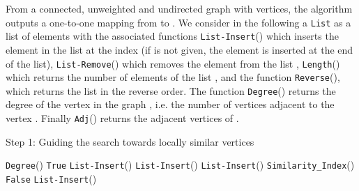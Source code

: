 \documentclass{scrartcl}
\theoremstyle{plain}
\begin{document}
From a connected, unweighted and undirected graph  with  vertices,  
the algorithm outputs a one-to-one mapping  from  to . We consider in the following a \texttt{List} as a list of elements with 
the associated functions \texttt{List-Insert}() which inserts the 
element  in the list  at the index  (if  is not given, the 
element  is inserted at the end of the list), \texttt{List-Remove}() 
which removes the element  from the list , \texttt{Length}() which 
returns the number of elements of the list , and the function 
\texttt{Reverse}(), which returns the list  in the reverse order. The 
function \texttt{Degree}() returns the degree of the vertex  in the graph 
, i.e. the number of vertices adjacent to the vertex . Finally 
\texttt{Adj}() returns the adjacent vertices of .

\begin{algorithm}[!ht]
  \caption{Step 1: Guiding the search towards locally similar vertices}
  \label{algo:step1}
  \begin{algorithmic}[1]
  	\REQUIRE 
  	\ENSURE 
	\STATE 
	\STATE 
    \STATE \texttt{Degree}()
    \STATE 
    \STATE  \texttt{True}
    \STATE 
    \WHILE{}
    \STATE \texttt{List-Insert}()
    \STATE 
    \FORALL{}
    \STATE \texttt{List-Insert}()
    \STATE 
    \ELSE
    \STATE \texttt{List-Insert}()
    \ENDIF
    \ENDFOR
    \STATE \texttt{Similarity\_Index}()	
    \ELSE
    \STATE  \texttt{False}
    \ENDIF
    \ENDWHILE
    \STATE \texttt{List-Insert}()
    \ENDWHILE
  \end{algorithmic}
\end{algorithm}
\end{document}
